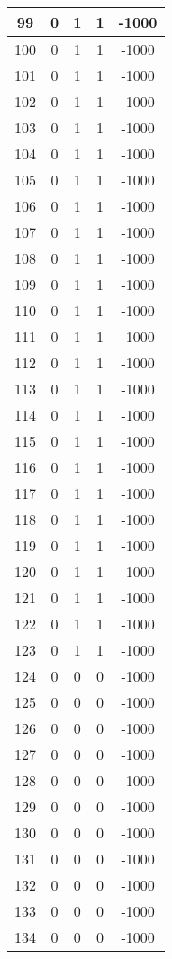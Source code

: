 \documentclass[letterpaper, 12pt]{article}
\begin{document}
\begin{longtable}{|c|c|c|c|c|}
\hline
99 & 0 & 1 & 1 & -1000 \\
\hline
100 & 0 & 1 & 1 & -1000 \\
\hline
101 & 0 & 1 & 1 & -1000 \\
\hline
102 & 0 & 1 & 1 & -1000 \\
\hline
103 & 0 & 1 & 1 & -1000 \\
\hline
104 & 0 & 1 & 1 & -1000 \\
\hline
105 & 0 & 1 & 1 & -1000 \\
\hline
106 & 0 & 1 & 1 & -1000 \\
\hline
107 & 0 & 1 & 1 & -1000 \\
\hline
108 & 0 & 1 & 1 & -1000 \\
\hline
109 & 0 & 1 & 1 & -1000 \\
\hline
110 & 0 & 1 & 1 & -1000 \\
\hline
111 & 0 & 1 & 1 & -1000 \\
\hline
112 & 0 & 1 & 1 & -1000 \\
\hline
113 & 0 & 1 & 1 & -1000 \\
\hline
114 & 0 & 1 & 1 & -1000 \\
\hline
115 & 0 & 1 & 1 & -1000 \\
\hline
116 & 0 & 1 & 1 & -1000 \\
\hline
117 & 0 & 1 & 1 & -1000 \\
\hline
118 & 0 & 1 & 1 & -1000 \\
\hline
119 & 0 & 1 & 1 & -1000 \\
\hline
120 & 0 & 1 & 1 & -1000 \\
\hline
121 & 0 & 1 & 1 & -1000 \\
\hline
122 & 0 & 1 & 1 & -1000 \\
\hline
123 & 0 & 1 & 1 & -1000 \\
\hline
124 & 0 & 0 & 0 & -1000 \\
\hline
125 & 0 & 0 & 0 & -1000 \\
\hline
126 & 0 & 0 & 0 & -1000 \\
\hline
127 & 0 & 0 & 0 & -1000 \\
\hline
128 & 0 & 0 & 0 & -1000 \\
\hline
129 & 0 & 0 & 0 & -1000 \\
\hline
130 & 0 & 0 & 0 & -1000 \\
\hline
131 & 0 & 0 & 0 & -1000 \\
\hline
132 & 0 & 0 & 0 & -1000 \\
\hline
133 & 0 & 0 & 0 & -1000 \\
\hline
134 & 0 & 0 & 0 & -1000 \\

\end{longtable}
\end{document}
